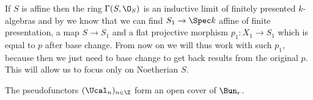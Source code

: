         \begin{remark}
            \label{remark:wang_4_1_4}
            If $S$ is affine then the ring $\Gamma(S, \O_S)$ is an inductive limit of finitely presented $k$-algebras and by \cite[Tome~3, 8]{EGA4} we know that we can find $S_1 \to \Spec k$ affine of finite presentation, a map $S \to S_1$ and a flat projective morphism $p_1\colon X_1 \to S_1$ which is equal to $p$ after base change. From now on we will thus work with such $p_1$, because then we just need to base change to get back results from the original $p$. This will allow us to focus only on Noetherian $S$.
        \end{remark}

        \begin{lemma}
            \label{lemma:wang_4_1_5}
            The pseudofunctors $(\Ucal_n)_{n \in \Z}$ form an open cover of $\Bun_r$.
        \end{lemma}
